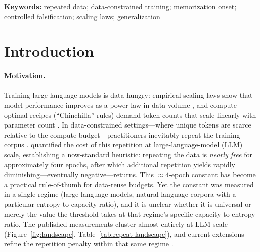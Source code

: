 \documentclass[11pt]{article}
\begin{document}
\vspace{4pt}\noindent\textbf{Keywords:} repeated data; data-constrained training;
memorization onset; controlled falsification; scaling laws; generalization


\section{Introduction}\label{sec:intro}

\paragraph{Motivation.}
Training large language models is data-hungry: empirical scaling laws show that model
performance improves as a power law in data volume \citep{kaplan2020scalinglaws}, and
compute-optimal recipes (``Chinchilla'' rules) demand token counts that scale linearly
with parameter count \citep{hoffmann2022chinchilla}. In data-constrained settings---where
unique tokens are scarce relative to the compute budget---practitioners inevitably repeat
the training corpus \citep{xue2023repeat}. \citet{muennighoff2023scaling} quantified the cost of this repetition
at large-language-model (LLM) scale, establishing a now-standard heuristic: repeating the data is
\emph{nearly free} for approximately four epochs, after which additional repetition yields
rapidly diminishing---eventually negative---returns. This $\approx 4$-epoch constant has
become a practical rule-of-thumb for data-reuse budgets. Yet the constant was measured in
a single regime (large language models, natural-language corpora with a particular
entropy-to-capacity ratio), and it is unclear whether it is universal or merely the value
the threshold takes at that regime's specific capacity-to-entropy ratio. The published
measurements cluster almost entirely at LLM scale
(Figure~\ref{fig:landscape}, Table~\ref{tab:repeat-landscape}), and current extensions
refine the repetition penalty within that same regime \citep{lovelace2026prescriptive}.
\end{document}
